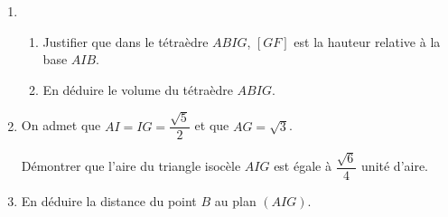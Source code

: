 \begin{enumerate}
	\item 
	\begin{enumerate}
		\item Justifier que dans le tétraèdre $ABIG$, $[GF]$ est la hauteur relative à la base $AIB$.
		\item En déduire le volume du tétraèdre $ABIG$.
	\end{enumerate}
	\item On admet que $AI=IG=\dfrac{\sqrt{5}}{2}$ et que $AG=\sqrt{3}$.
	
	Démontrer que l'aire du triangle isocèle $AIG$ est égale à $\dfrac{\sqrt{6}}{4}$ unité d'aire.
	\item En déduire la distance du point $B$ au plan $(AIG)$.
\end{enumerate}
